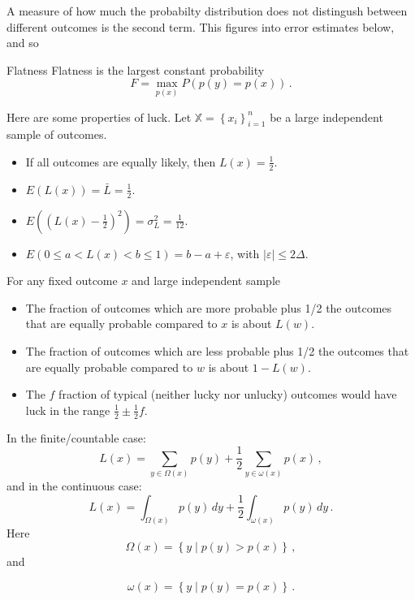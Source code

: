A measure of how much the probabilty distribution does not distingush between different outcomes is the second term.  This figures into error estimates below, and so
\begin{definition}{Flatness}  Flatness is the largest constant probability 
\begin{equation}
F = \max_{p(x)} P(p(y) = p(x)) \,.
\end{equation}
\end{definition}
Here are some properties of luck.  Let ${\mathbb{X}}=\left\{x_i\right\}_{i=1}^{n}$ be a large independent sample of outcomes.
\begin{itemize}
\item If all outcomes are equally likely, then $L(x)=\frac{1}{2}$.
\item $E(L(x))=\bar{L}=\frac{1}{2}$.
\item $E((L(x)-\frac{1}{2})^2)=\sigma_L^2 =\frac{1}{12}$.
\item $E(0 \leq a < L(x) < b \leq 1) = b-a + \varepsilon $, with $|\varepsilon| \leq 2\Delta$.
\end{itemize}

For any fixed outcome $x$ and large independent sample 
\begin{itemize}
\item The fraction of outcomes which are more probable plus 1/2 the outcomes that are equally probable compared to $x$ is about $L(w)$.
\item The fraction of outcomes which are less probable plus 1/2 the outcomes that are equally probable compared to $w$ is about $1-L(w)$.
\item The $f$ fraction of typical (neither lucky nor unlucky) outcomes would have luck in the range $\frac{1}{2} \pm \frac{1}{2}f$. 
\end{itemize}

In the finite/countable case:
\begin{equation}
L(x) = \sum_{y \in \Omega(x)} p(y) + \frac{1}{2} \sum_{y \in \omega (x)} p(x) \,,
\end{equation}
and in the continuous case:
\begin{equation}
L(x) = \int_{\Omega(x)} p(y) \, dy + \frac{1}{2} \int_{\omega(x)} p(y) \, dy \,.
\end{equation}
Here 
\begin{equation}
\Omega(x) = \left\{ y \mid p(y)>p(x) \right\} \,,
\end{equation}
and

\begin{equation}
\omega(x) = \left\{ y \mid p(y)=p(x) \right\} \,.
\end{equation}



